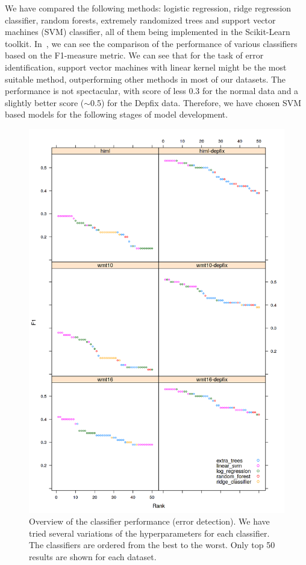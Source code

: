 We have compared the following methods: logistic regression, ridge regression classifier,
random forests, extremely randomized trees and support vector machines (SVM) classifier, all
of them being implemented in the Scikit-Learn toolkit.
In~, we can see the comparison of the performance of various classifiers based
on the F1-measure metric. We can see that for the task of error identification, support vector
machines with linear kernel might be the most suitable method, outperforming other methods in most of our
datasets. The  performance is not spectacular, with score of less 0.3 for the normal data
and a slightly better score ($\sim$0.5) for the Depfix data. Therefore, we have chosen SVM based
models for the following stages of model development.

\begin{figure}
\centering
  \includegraphics[scale=0.7]{wf-class}
  \caption{
    Overview of the classifier performance (error detection).
We have tried several variations of the hyperparameters
for each classifier. The classifiers are ordered from the best to the worst. Only top 50 results
are shown for each dataset.
}
  \label{wf-draft}
\end{figure}

